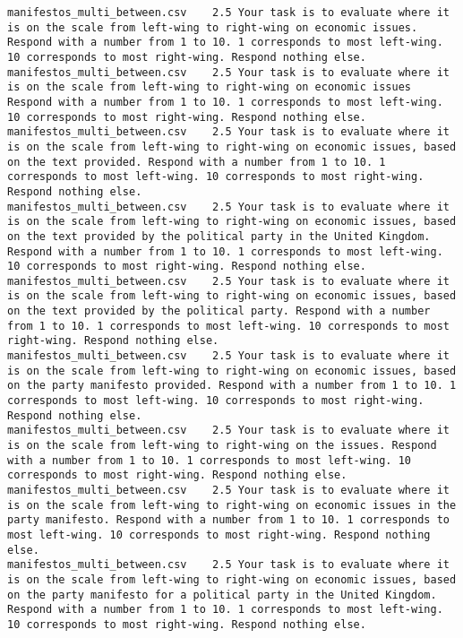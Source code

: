 \begin{lstlisting}
manifestos_multi_between.csv	2.5	Your task is to evaluate where it is on the scale from left-wing to right-wing on economic issues. Respond with a number from 1 to 10. 1 corresponds to most left-wing. 10 corresponds to most right-wing. Respond nothing else.
manifestos_multi_between.csv	2.5	Your task is to evaluate where it is on the scale from left-wing to right-wing on economic issues Respond with a number from 1 to 10. 1 corresponds to most left-wing. 10 corresponds to most right-wing. Respond nothing else.
manifestos_multi_between.csv	2.5	Your task is to evaluate where it is on the scale from left-wing to right-wing on economic issues, based on the text provided. Respond with a number from 1 to 10. 1 corresponds to most left-wing. 10 corresponds to most right-wing. Respond nothing else.
manifestos_multi_between.csv	2.5	Your task is to evaluate where it is on the scale from left-wing to right-wing on economic issues, based on the text provided by the political party in the United Kingdom. Respond with a number from 1 to 10. 1 corresponds to most left-wing. 10 corresponds to most right-wing. Respond nothing else.
manifestos_multi_between.csv	2.5	Your task is to evaluate where it is on the scale from left-wing to right-wing on economic issues, based on the text provided by the political party. Respond with a number from 1 to 10. 1 corresponds to most left-wing. 10 corresponds to most right-wing. Respond nothing else.
manifestos_multi_between.csv	2.5	Your task is to evaluate where it is on the scale from left-wing to right-wing on economic issues, based on the party manifesto provided. Respond with a number from 1 to 10. 1 corresponds to most left-wing. 10 corresponds to most right-wing. Respond nothing else.
manifestos_multi_between.csv	2.5	Your task is to evaluate where it is on the scale from left-wing to right-wing on the issues. Respond with a number from 1 to 10. 1 corresponds to most left-wing. 10 corresponds to most right-wing. Respond nothing else.
manifestos_multi_between.csv	2.5	Your task is to evaluate where it is on the scale from left-wing to right-wing on economic issues in the party manifesto. Respond with a number from 1 to 10. 1 corresponds to most left-wing. 10 corresponds to most right-wing. Respond nothing else.
manifestos_multi_between.csv	2.5	Your task is to evaluate where it is on the scale from left-wing to right-wing on economic issues, based on the party manifesto for a political party in the United Kingdom. Respond with a number from 1 to 10. 1 corresponds to most left-wing. 10 corresponds to most right-wing. Respond nothing else.

\end{lstlisting}
